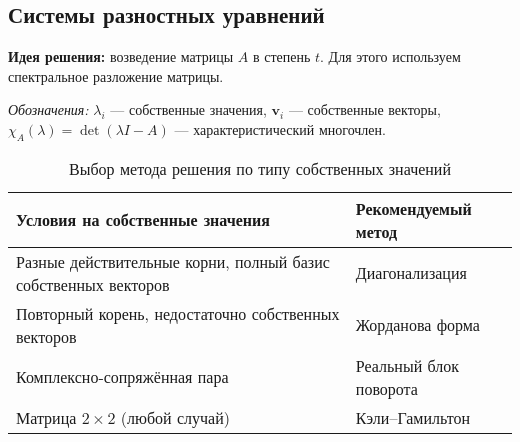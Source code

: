 \subsection{Системы разностных уравнений}\label{subsec:systems}



\textbf{Идея решения:} возведение матрицы $A$ в степень $t$. Для этого используем спектральное разложение матрицы.

\textit{Обозначения:} $\lambda_i$ — собственные значения, $\mathbf{v}_i$ — собственные векторы, $\chi_A(\lambda) = \det(\lambda I - A)$ — характеристический многочлен.

\begin{table}[h!]
\centering
\caption{Выбор метода решения по типу собственных значений}
\label{tab:method-selection}
\begin{tabular}{|l|l|}
\hline
\textbf{Условия на собственные значения} & \textbf{Рекомендуемый метод} \\
\hline
Разные действительные корни, полный базис собственных векторов & Диагонализация \\
\hline
Повторный корень, недостаточно собственных векторов & Жорданова форма \\
\hline
Комплексно-сопряжённая пара & Реальный блок поворота \\
\hline
Матрица $2 \times 2$ (любой случай) & Кэли–Гамильтон \\
\hline
\end{tabular}
\end{table}

